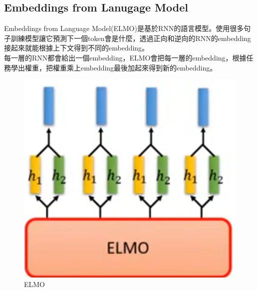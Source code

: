 \subsection{Embeddings from Lanugage Model}
Embeddings from Language Model(ELMO)是基於RNN的語言模型。使用很多句子訓練模型讓它預測下一個token會是什麼，透過正向和逆向的RNN的embedding接起來就能根據上下文得到不同的embedding。\\每一層的RNN都會給出一個embedding，ELMO會把每一層的embedding，根據任務學出權重，把權重乘上embedding最後加起來得到新的embedding。
\begin{figure}[htbp!]
    \centering
    \begin{minipage}[t]{0.2 \linewidth}
        \includegraphics[width=\linewidth]{images/w6/ELMO.png}
		\caption{ELMO}
    \end{minipage}
    \hspace{4em}
    \begin{minipage}[t]{0.2 \linewidth}

\end{minipage}
\end{figure}
